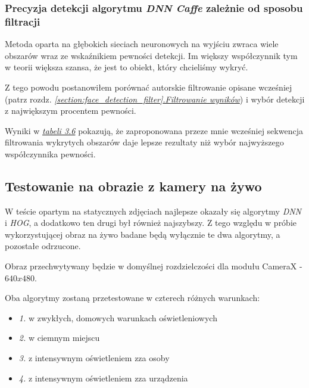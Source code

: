 \subsubsection{Precyzja detekcji algorytmu \textit{DNN Caffe} zależnie od sposobu filtracji}

Metoda oparta na głębokich sieciach neuronowych na wyjściu zwraca wiele obszarów wraz ze wskaźnikiem pewności detekcji. Im większy współczynnik tym w teorii większa szansa, że jest to obiekt, który chcieliśmy wykryć.
\par
Z tego powodu postanowiłem porównać autorskie filtrowanie opisane wcześniej (patrz rozdz. \hyperref[{section:face_detection_filter}]{\textit{\ref{section:face_detection_filter}.Filtrowanie wyników}}) i wybór detekcji z największym procentem pewności.
\par

\vspace{8mm}



Wyniki w \hyperref[{tab:face_filter_test}]{\textit{tabeli 3.6}} pokazują, że zaproponowana przeze mnie wcześniej sekwencja filtrowania wykrytych obszarów daje lepsze rezultaty niż wybór najwyższego współczynnika pewności.


\subsection{Testowanie na obrazie z kamery na żywo} \label{section:face_detection_test_live}

W teście opartym na statycznych zdjęciach najlepsze okazały się algorytmy \textit{DNN} i \textit{HOG}, a dodatkowo ten drugi był również najszybszy. Z tego względu w próbie wykorzystującej obraz na żywo badane będą wyłącznie te dwa algorytmy, a pozostałe odrzucone.
\par
Obraz przechwytywany będzie w domyślnej rozdzielczości dla modułu CameraX - $640x480$. \cite{camerax}
\par
Oba algorytmy zostaną przetestowane w czterech różnych warunkach:
\begin{itemize}
    \item \textit{1.} w zwykłych, domowych warunkach oświetleniowych
    \item \textit{2.} w ciemnym miejscu
    \item \textit{3.} z intensywnym oświetleniem zza osoby 
    \item \textit{4.} z intensywnym oświetleniem zza urządzenia
\end{itemize}

